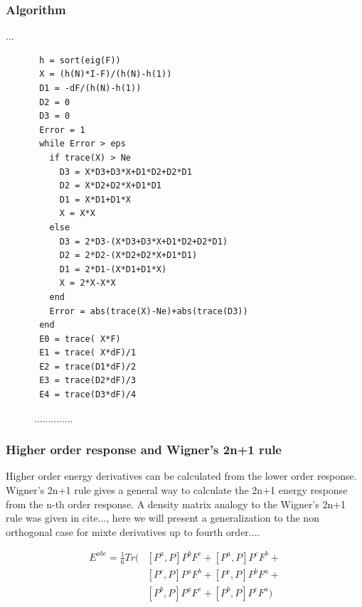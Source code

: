 \documentclass[twocolumn,showpacs,preprintnumbers,amsmath,amssymb]{revtex4}
\begin{document}
\subsubsection{Algorithm}
...\\
\begin{figure}[htbp]
  \centering
  \caption{\protect
    ..............
  }\label{fig:algo}
\begin{verbatim}
 h = sort(eig(F))
 X = (h(N)*I-F)/(h(N)-h(1))
 D1 = -dF/(h(N)-h(1))
 D2 = 0
 D3 = 0
 Error = 1
 while Error > eps
   if trace(X) > Ne
     D3 = X*D3+D3*X+D1*D2+D2*D1
     D2 = X*D2+D2*X+D1*D1
     D1 = X*D1+D1*X
     X = X*X
   else
     D3 = 2*D3-(X*D3+D3*X+D1*D2+D2*D1)
     D2 = 2*D2-(X*D2+D2*X+D1*D1)
     D1 = 2*D1-(X*D1+D1*X)
     X = 2*X-X*X
   end
   Error = abs(trace(X)-Ne)+abs(trace(D3))
 end
 E0 = trace( X*F)
 E1 = trace( X*dF)/1
 E2 = trace(D1*dF)/2
 E3 = trace(D2*dF)/3
 E4 = trace(D3*dF)/4
\end{verbatim}
\end{figure}


\subsubsection{Higher order response and Wigner's 2n+1 rule }
Higher order energy derivatives can be calculated from the lower
order response. Wigner's 2n+1 rule gives a general way to calculate the 2n+1
energy response from the n-th order response. A density matrix analogy to
the Wigner's 2n+1 rule was given in cite{...}, here we will present
a generalization to the non orthogonal case for mixte derivatives 
up to fourth order....



\begin{equation}
\begin{split}
  E^{abc}=\frac{1}{6}Tr(&[P^a,P]P^bF^c+[P^a,P]P^cF^b+\\
                        &[P^c,P]P^aF^b+[P^c,P]P^bF^a+\\
                        &[P^b,P]P^aF^c+[P^b,P]P^cF^a)
\end{split}
\end{equation}
\end{document}
